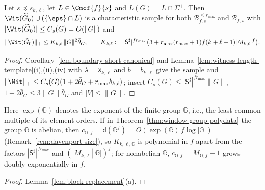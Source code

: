 \begin{theorem}
\label{thm:boundary-polydata}
Let $s\preceq s_{k,\ell}$, let $L\in\Cmcf{f}{s}$ and $L(G)=L\cap\Sigma^+$.  Then
$\Wit(\widetilde G_0)\cup(\{\eps\}\cap L)$ is a characteristic sample for both
$\mathcal B^{\le r_{\max}}_{f,s}$ and $\mathcal B_{f,s}$ with
$|\Wit(\widetilde G_0)|\le C_s(G)=O(\|G\|)$ and
\[
 \|\Wit(\widetilde G_0)\|_+\le K_{k,\ell}\,\|G\|^2\bar\theta_G,\qquad
 K_{k,\ell}:=|\mathsf S^\sharp|^{fr_{\max}}
   \bigl(3+r_{\max}(r_{\max}+1)f(k+\ell+1)|M_{k,\ell}|^f\bigr).
\]
\end{theorem}

\begin{proof}
Corollary~\ref{lem:boundary-short-canonical} and
Lemma~\ref{lem:witness-length-template}(i),(ii),(iv) with
$\lambda=\widehat s_{k,\ell}$ and $b=b_{k,\ell}$ give the sample and
$\|\Wit\|_+\le C_s(G)(1+2\bar\theta_G+r_{\max}b_{k,\ell})$; insert
$C_s(G)\le|\mathsf S^\sharp|^{fr_{\max}}\|G\|$, $1+2\bar\theta_G\le3\|G\|\bar\theta_G$ and
$|V|\le\|G\|$.
\end{proof}

\begin{theorem}
\label{thm:window-abelian-polydata}
Here $\exp({\mathbb G})$ denotes the exponent of the finite group ${\mathbb G}$, i.e.,
the least common multiple of its element orders.  If in
Theorem~\ref{thm:window-group-polydata} the group ${\mathbb G}$ is abelian, then
$c_{{\mathbb G},f}=\mathsf d({\mathbb G}^f)=O(\exp({\mathbb G})\,f\log|{\mathbb G}|)$
(Remark~\ref{rem:davenport-size}), so $K_{k,\ell,{\mathbb G}}$ is polynomial in $f$ apart from
the factors $|\mathsf S^\sharp|^{fr_{\max}}$ and $(|M_{k,\ell}||{\mathbb G}|)^f$; for
nonabelian ${\mathbb G}$, $c_{{\mathbb G},f}=M_{{\mathbb G},f}-1$ grows doubly exponentially in $f$.
\end{theorem}

\begin{proof}
Lemma~\ref{lem:block-replacement}(a).
\end{proof}

